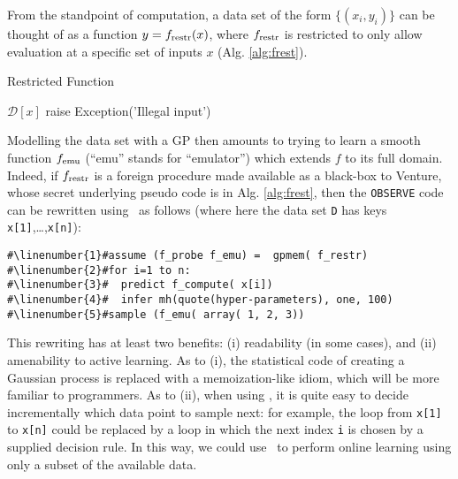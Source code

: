 \label{sec:special-case-gpmem}
From the standpoint of computation, a data set of the form $\{(x_i, y_i)\}$ can be thought of as a function $y = f_{\textrm{restr}}(x)$, where $f_{\textrm{restr}}$ is restricted to only allow evaluation at a specific set of inputs $x$ (Alg. \ref{alg:frest}).
\begin{algorithm}

\caption{Restricted Function}

\begin{algorithmic}[1]

 \State \Return $\mathcal{D}[x]$
\Else
 \State raise Exception('Illegal input')
\EndIf 
\EndFunction

\end{algorithmic}
  \label{alg:frest}


\end{algorithm}


Modelling the data set with a GP then amounts to trying to learn a smooth function $f_{\textrm{emu}}$ (``emu'' stands for ``emulator'') which extends $f$ to its full domain.
Indeed, if $f_{\textrm{restr}}$ is a foreign procedure made available as a black-box to Venture, whose secret underlying pseudo code is in Alg. \ref{alg:frest},
then the \texttt{OBSERVE} code can be rewritten using \gpmem\ as follows (where here the data set \texttt{D} has keys \texttt{x[1]},\ldots,\texttt{x[n]}):
\begin{mdframed}
\begin{minipage}{0.9\linewidth}

\begin{lstlisting}[mathescape,label=alg:venfrest,basicstyle=\selectfont\ttfamily,numbers=none,caption={Observation with \gpmem},escapechar=\#]
#\linenumber{1}#assume (f_probe f_emu) =  gpmem( f_restr)
#\linenumber{2}#for i=1 to n:
#\linenumber{3}#  predict f_compute( x[i])
#\linenumber{4}#  infer mh(quote(hyper-parameters), one, 100)
#\linenumber{5}#sample (f_emu( array( 1, 2, 3))
\end{lstlisting}
\end{minipage}
\end{mdframed}


\vspace{0.2cm}
This rewriting has at least two benefits: (i) readability (in some cases), and (ii) amenability to active learning.
As to (i), the statistical code of creating a Gaussian process is replaced with a memoization-like idiom, which will be more familiar to programmers.
As to (ii), when using \gpmem, it is quite easy to decide incrementally which data point to sample next: for example, the loop from \texttt{x[1]} to \texttt{x[n]} could be replaced by a loop in which the next index \texttt{i} is chosen by a supplied decision rule.
In this way, we could use \gpmem\ to perform online learning using only a subset of the available data.

